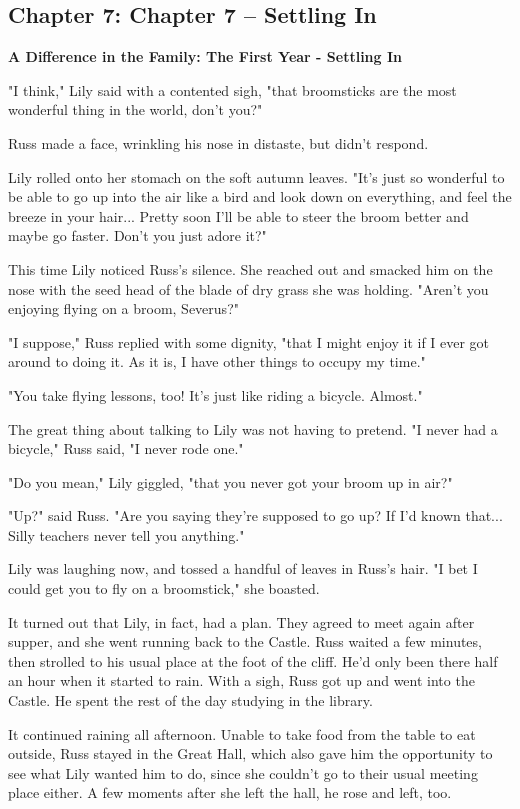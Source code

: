 \documentclass[a4paper,11pt]{article}
\begin{document}
\subsection{Chapter 7: Chapter 7  – Settling In}

\textbf{A Difference in the Family: The First Year - Settling In}

"I think," Lily said with a contented sigh, "that broomsticks are the most wonderful thing in the world, don't you?"

Russ made a face, wrinkling his nose in distaste, but didn't respond.

Lily rolled onto her stomach on the soft autumn leaves. "It's just so wonderful to be able to go up into the air like a bird and look down on everything, and feel the breeze in your hair... Pretty soon I'll be able to steer the broom better and maybe go faster. Don't you just adore it?"

This time Lily noticed Russ's silence. She reached out and smacked him on the nose with the seed head of the blade of dry grass she was holding. "Aren't you enjoying flying on a broom, Severus?"

"I suppose," Russ replied with some dignity, "that I might enjoy it if I ever got around to doing it. As it is, I have other things to occupy my time."

"You take flying lessons, too! It's just like riding a bicycle. Almost."

The great thing about talking to Lily was not having to pretend. "I never had a bicycle," Russ said, "I never rode one."

"Do you mean," Lily giggled, "that you never got your broom up in air?"

"Up?" said Russ. "Are you saying they're supposed to go up? If I'd known that... Silly teachers never tell you anything."

Lily was laughing now, and tossed a handful of leaves in Russ's hair. "I bet I could get you to fly on a broomstick," she boasted.

It turned out that Lily, in fact, had a plan. They agreed to meet again after supper, and she went running back to the Castle. Russ waited a few minutes, then strolled to his usual place at the foot of the cliff. He'd only been there half an hour when it started to rain. With a sigh, Russ got up and went into the Castle. He spent the rest of the day studying in the library.

It continued raining all afternoon. Unable to take food from the table to eat outside, Russ stayed in the Great Hall, which also gave him the opportunity to see what Lily wanted him to do, since she couldn't go to their usual meeting place either. A few moments after she left the hall, he rose and left, too.
\end{document}
